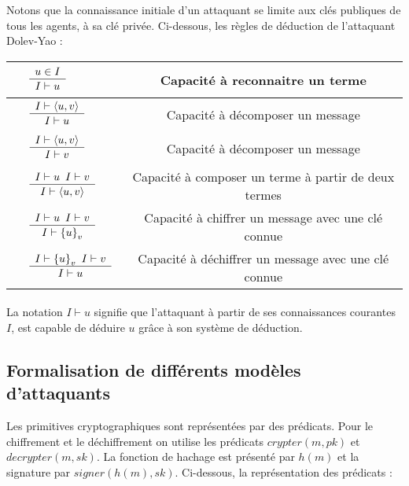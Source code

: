 \documentclass[10pt,a4paper]{article}
\newcommand{\VERT}[1]{{\color{green}#1}}
\newcommand{\bl}[1]{\textcolor{black}{#1}}
\newcommand{\inferLabel}[3]{\bl{
    \begin{array}{cc}
    {\VERT{#1}} \quad
    \begin{array}{c}
      #2\\
      \hline \noalign{\vskip 1pt}#3
    \end{array}
  \end{array}
  }}
\begin{document}
Notons que la connaissance initiale d’un attaquant se limite aux clés publiques de tous les agents, à sa clé privée. Ci-dessous, les règles de déduction de l'attaquant Dolev-Yao :\newline
\begin{center}
\begin{tabular}{|l|c|}
  \hline
  $\inferLabel{}{ u \in I}{I\vdash u}$ & Capacité à reconnaitre un terme \\
  \hline
  $\inferLabel{}{ I \vdash \langle u,v \rangle}{I\vdash u}$ & Capacité à décomposer un message  \\
  \hline
  $\inferLabel{}{ I \vdash \langle u,v \rangle}{I\vdash v}$ & Capacité à décomposer un message \\
  \hline
  $\inferLabel{}{ I \vdash u \hspace{5pt} I \vdash v }{I \vdash \langle u,v \rangle}$ & Capacité  à  composer  un  terme  à  partir  de  deux termes \\
  \hline
  $\inferLabel{}{ I \vdash u \hspace{5pt} I \vdash v }{I \vdash {\lbrace u \rbrace}_{v}}$ & Capacité  à  chiffrer  un  message  avec  une  clé connue \\
  \hline
  $\inferLabel{}{ I \vdash {\lbrace u \rbrace}_{v} \hspace{5pt} I \vdash v }{I \vdash u}$ & Capacité  à  déchiffrer  un  message  avec  une  clé connue \\
  \hline
\end{tabular}
\end{center}
\medskip

\paragraph{}
La notation $I \vdash u$ signifie que l’attaquant à partir de ses connaissances courantes $I$,
est capable de déduire $u$ grâce à son système de déduction.
  
\subsection{Formalisation de différents modèles d'attaquants}
Les primitives cryptographiques sont représentées par des prédicats. Pour le chiffrement et le déchiffrement on utilise les prédicats $crypter(m, pk)$ et $decrypter(m, sk)$. La fonction de hachage est présenté par $h(m)$ et la signature par $signer(h(m), sk)$. Ci-dessous, la représentation des prédicats :\newpage
  
\end{document}
